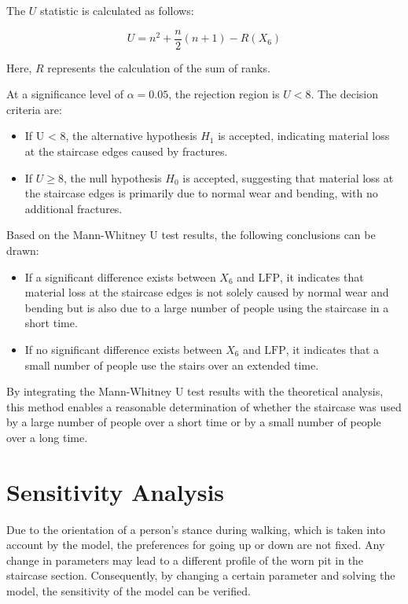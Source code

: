 \documentclass{mcmthesis}
\begin{document}
The $U$ statistic is calculated as follows:

$$U = n^2 + \frac{n}{2}(n + 1) - R(X_6)$$

Here, $R$ represents the calculation of the sum of ranks.

At a significance level of \(\alpha = 0.05\), the rejection region is \(U < 8\). The decision criteria are:
\begin{itemize} 

\item If U < 8, the alternative hypothesis $H_1$ is accepted, indicating material loss at the staircase edges caused by fractures.

\item If \(U \geq 8\), the null hypothesis $H_0$ is accepted, suggesting that material loss at the staircase edges is primarily due to normal wear and bending, with no additional fractures.

\end{itemize}

Based on the Mann-Whitney U test results, the following conclusions can be drawn:


\begin{itemize} 
\item If a significant difference exists between \( X_6 \) and \( \text{LFP} \), it indicates that material loss at the staircase edges is not solely caused by normal wear and bending but is also due to a large number of people using the staircase in a short time. 
\item If no significant difference exists between \( X_6 \) and \( \text{LFP} \), it indicates that a small number of people use the stairs over an extended time. 
\end{itemize}

By integrating the Mann-Whitney U test results with the theoretical analysis, this method enables a reasonable determination of whether the staircase was used by a large number of people over a short time or by a small number of people over a long time.


\section{Sensitivity Analysis}

Due to the orientation of a person's stance during walking, which is taken into account by the model, the preferences for going up or down are not fixed. Any change in parameters may lead to a different profile of the worn pit in the staircase section. Consequently, by changing a certain parameter and solving the model, the sensitivity of the model can be verified.
\end{document}
